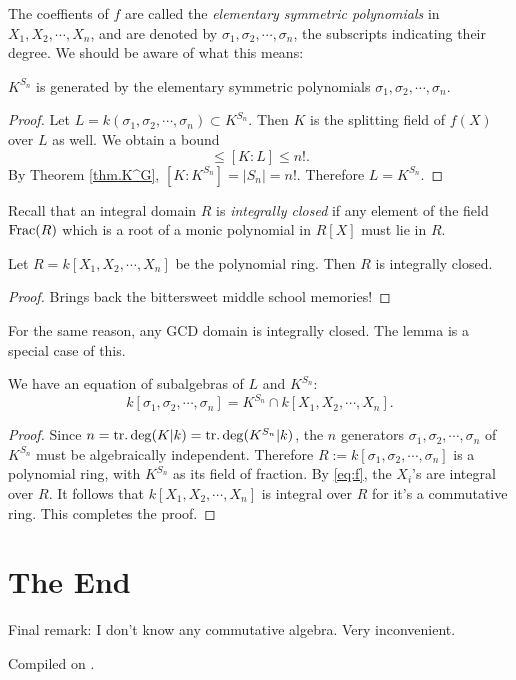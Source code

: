 \documentclass{article}
\begin{document}
The coeffients of $f$ are called the \emph{elementary symmetric polynomials} in $X_1,X_2,\cdots,X_n$, and are denoted by $\sigma_1,\sigma_2,\cdots,\sigma_n$, the subscripts indicating their degree. We should be aware of what this means:

\begin{proposition}
    $K^{S_n}$ is generated by the elementary symmetric polynomials $\sigma_1,\sigma_2,\cdots,\sigma_n$.
\end{proposition}

\begin{proof}
    Let $L=k(\sigma_1,\sigma_2,\cdots,\sigma_n)\subset K^{S_n}$. Then $K$ is the splitting field of $f(X)$ over $L$ as well. We obtain a bound
    \begin{equation*}
        [K:K^{S_n}] \leq [K:L] \leq n!.
    \end{equation*}
    By Theorem \ref{thm.K^G}, $[K:K^{S_n}]=\vert S_n\vert=n!$. Therefore $L=K^{S_n}$.
\end{proof}

Recall that an integral domain $R$ is \emph{integrally closed} if any element of the field $\operatorname{Frac}(R)$ which is a root of a monic polynomial in $R[X]$ must lie in $R$.

\begin{lemma}
    Let $R=k[X_1,X_2,\cdots,X_n]$ be the polynomial ring. Then $R$ is integrally closed.
\end{lemma}

\begin{proof}
    Brings back the bittersweet middle school memories!
\end{proof}

\begin{remark}
    For the same reason, any GCD domain is integrally closed. The lemma is a special case of this.
\end{remark}

\begin{theorem}
    We have an equation of subalgebras of $L$ and $K^{S_n}$:
    \begin{equation*}
        k[\sigma_1,\sigma_2,\cdots,\sigma_n] = K^{S_n}\cap k[X_1,X_2,\cdots,X_n].
    \end{equation*}
\end{theorem}

\begin{proof}
    Since $n=\operatorname{tr.deg}(K\vert k)=\operatorname{tr.deg}(K^{S_n}\vert k)$, the $n$ generators $\sigma_1,\sigma_2,\cdots,\sigma_n$ of $K^{S_n}$ must be algebraically independent. Therefore $R:=k[\sigma_1,\sigma_2,\cdots,\sigma_n]$ is a polynomial ring, with $K^{S_n}$ as its field of fraction. By \eqref{eq:f}, the $X_i$'s are integral over $R$. It follows that $k[X_1,X_2,\cdots,X_n]$ is integral over $R$ for it's a commutative ring. This completes the proof.
\end{proof}

\section*{The End}

Final remark: I don't know any commutative algebra. Very inconvenient.

\hfill

\noindent Compiled on \todayymd.

\noindent\home
\end{document}
